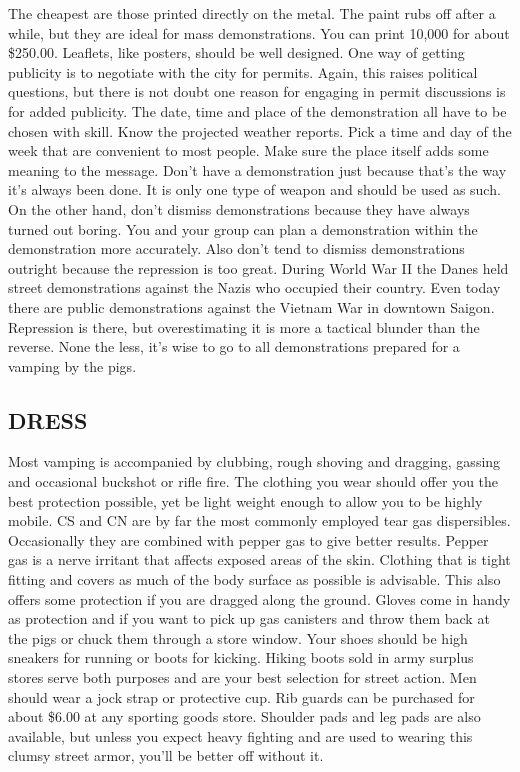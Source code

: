 \documentclass[11pt,twoside,a4paper]{book}
\begin{document}
The cheapest are those printed directly on the metal. The paint rubs off after a while, but they are ideal for mass demonstrations. You can print 10,000 for about \$250.00. Leaflets, like posters, should be well designed. One way of getting publicity is to negotiate with the city for permits. Again, this raises political questions, but there is not doubt one reason for engaging in permit discussions is for added publicity. The date, time and place of the demonstration all have to be chosen with skill. Know the projected weather reports. Pick a time and day of the week that are convenient to most people. Make sure the place itself adds some meaning to the message. Don't have a demonstration just because that's the way it's always been done. It is only one type of weapon and should be used as such. On the other hand, don't dismiss demonstrations because they have always turned out boring. You and your group can plan a demonstration within the demonstration more accurately. Also don't tend to dismiss demonstrations outright because the repression is too great. During World War II the Danes held street demonstrations against the Nazis who occupied their country. Even today there are public demonstrations against the Vietnam War in downtown Saigon. Repression is there, but overestimating it is more a tactical blunder than the reverse. None the less, it's wise to go to all demonstrations prepared for a vamping by the pigs. 

\subsection{DRESS}

Most vamping is accompanied by clubbing, rough shoving and dragging, gassing and occasional buckshot or rifle fire. The clothing you wear should offer you the best protection possible, yet be light weight enough to allow you to be highly mobile. CS and CN are by far the most commonly employed tear gas dispersibles. Occasionally they are combined with pepper gas to give better results. Pepper gas is a nerve irritant that affects exposed areas of the skin. Clothing that is tight fitting and covers as much of the body surface as possible is advisable. This also offers some protection if you are dragged along the ground. Gloves come in handy as protection and if you want to pick up gas canisters and throw them back at the pigs or chuck them through a store window. Your shoes should be high sneakers for running or boots for kicking. Hiking boots sold in army surplus stores serve both purposes and are your best selection for street action. Men should wear a jock strap or protective cup. Rib guards can be purchased for about \$6.00 at any sporting goods store. Shoulder pads and leg pads are also available, but unless you expect heavy fighting and are used to wearing this clumsy street armor, you'll be better off without it. 
\end{document}
